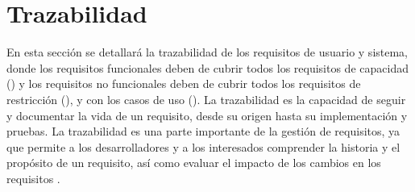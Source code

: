 \FloatBarrier

\section{Trazabilidad}\label{sec:trazabilidad}

En esta sección se detallará la trazabilidad de los requisitos de usuario y sistema, donde los requisitos funcionales deben de cubrir todos los requisitos de capacidad () y los requisitos no funcionales deben de cubrir todos los requisitos de restricción (), y con los casos de uso (). La trazabilidad es la capacidad de seguir y documentar la vida de un requisito, desde su origen hasta su implementación y pruebas. La trazabilidad es una parte importante de la gestión de requisitos, ya que permite a los desarrolladores y a los interesados comprender la historia y el propósito de un requisito, así como evaluar el impacto de los cambios en los requisitos \cite{IEEE-Requirements}.

\begin{table}[htb]
      {\traceabilityFNCA}
  \end{table}

\begin{table}[htb]
      {\traceabilityNFRE}
  \end{table}

